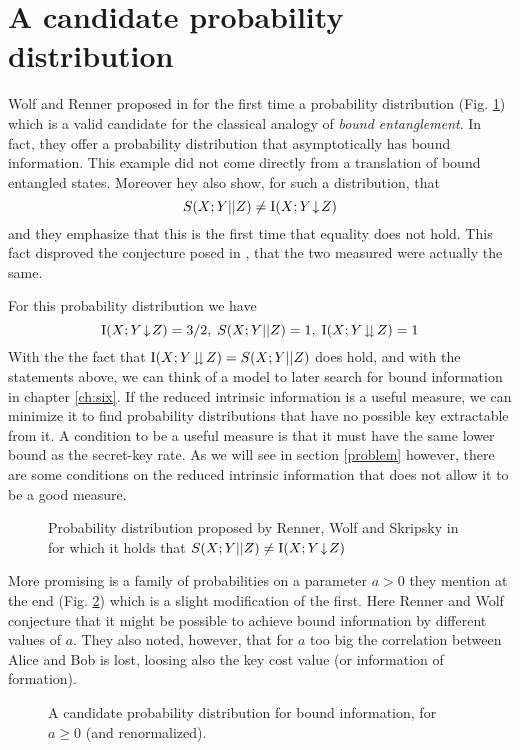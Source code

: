 \section{A candidate probability distribution}\label{daproblem}
    Wolf and Renner proposed in \cite{RW03} for the first time a probability distribution (Fig. \ref{Tab:candidate}) which is a valid candidate for the classical analogy of \emph{bound entanglement}. 
    In fact, they offer a probability distribution that asymptotically has bound information. 
    This example did not come directly from a translation of bound entangled states.
    Moreover hey also show, for such a distribution, that 
    \begin{equation}
    	S(X;Y||Z) \neq \operatorname{I}(X;Y\!\downarrow\!Z)
    \end{equation}  
     and they emphasize that this is the first time that equality does not hold. This fact disproved the conjecture posed in \cite{MW99}, that the two measured were actually the same.
     
     For this probability distribution we have
	$$ \operatorname{I}(X;Y\!\downarrow\!Z) = 3/2 ,\; S(X;Y||Z) = 1 , \; \operatorname{I}(X;Y\!\downdownarrows\!Z) = 1 $$
	With the the fact that $\operatorname{I}(X;Y\!\downdownarrows\!Z) = S(X;Y||Z)$ does hold, and with the statements above, we can think of a model to later search for bound information in chapter \ref{ch:six}. 
	If the reduced intrinsic information is a useful measure, we can minimize it to find probability distributions that have no possible key extractable from it.
	A condition to be a useful measure is that it must have the same lower bound as the secret-key rate.
	As we will see in section \ref{problem} however, there are some conditions on the reduced intrinsic information that does not allow it to be a good measure.
     
	\begin{figure}
		
	    \caption{Probability distribution proposed by Renner, Wolf and Skripsky in \cite{RW03} for which it holds that $S(X;Y||Z) \neq \operatorname{I}(X;Y\!\downarrow\!Z)$}
	    \label{Tab:candidate}
	\end{figure}	 
	
	More promising is a family of probabilities on a  parameter $a>0$ they mention at the end (Fig. \ref{Tab:candidate2}) which is a slight modification of the first. 
	Here Renner and Wolf conjecture that it might be possible to achieve bound information by different values of $a$. 
	They also noted, however, that for $a$ too big the correlation between Alice and Bob is lost, loosing also the key cost value (or information of formation).
	
	
	\begin{figure}
		
	    	
	    	\caption{A candidate probability distribution for bound information, for $a\geq 0$ (and renormalized).}
	    	\label{Tab:candidate2}
	\end{figure}
    